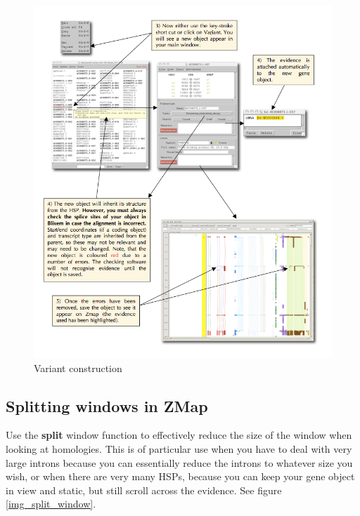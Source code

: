 \documentclass[letterpaper]{article}
\begin{document}
\begin{figure}
\centering
\color[rgb]{0.30980393,0.5058824,0.7411765}
\includegraphics[width=15.231cm]{img_variant_construction2.png}
\caption{Variant construction}
\label{img_variant_construction2}
\end{figure}

\subsection{Splitting windows in ZMap}
Use the \textbf{split} window function to effectively reduce the size of the window when looking at homologies. This is of particular use when you have to deal with very large introns because you can essentially reduce the introns to whatever size you wish, or when there are very many HSPs, because you can keep your gene object in view and static, but still scroll across the evidence. See figure \ref{img_split_window}.
\end{document}
